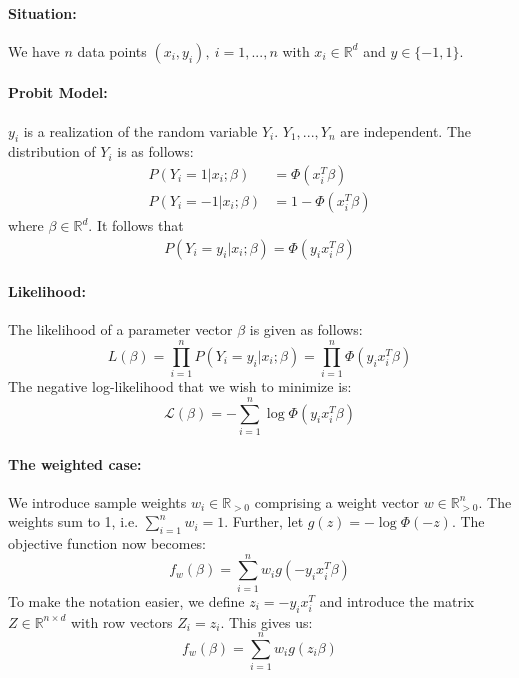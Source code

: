 \paragraph{Situation:}
We have $n$ data points $(x_i, y_i), \ i=1,...,n$ with
$x_i \in \mathbb{R}^d$ and $y \in \{ -1, 1\}$.

\paragraph{Probit Model:}
$y_i$ is a realization of the random variable $Y_i$.
$Y_1, ..., Y_n$ are independent.
The distribution of $Y_i$ is as follows:
\begin{align*}
    P(Y_i = 1 | x_i; \beta)  & = \Phi(x_i^T \beta)     \\
    P(Y_i = -1 | x_i; \beta) & = 1 - \Phi(x_i^T \beta)
\end{align*}
where $\beta \in \mathbb{R}^d$.
It follows that
\begin{align*}
    P(Y_i = y_i | x_i; \beta) = \Phi(y_i x_i^T \beta)
\end{align*}

\paragraph{Likelihood:}
The likelihood of a parameter vector $\beta$ is given as follows:
\begin{equation*}
    L(\beta) = \prod_{i=1}^n P(Y_i = y_i | x_i; \beta) = \prod_{i=1}^n \Phi(y_i x_i^T \beta)
\end{equation*}
The negative log-likelihood that we wish to minimize is:
\begin{equation*}
    \mathcal{L}(\beta) = -\sum_{i=1}^n \log \Phi(y_i x_i^T \beta)
\end{equation*}

\paragraph{The weighted case:}
We introduce sample weights $w_i \in \mathbb{R}_{>0}$
comprising a weight vector $w \in \mathbb{R}_{>0}^n$.
The weights sum to 1, i.e. $\sum_{i=1}^n w_i = 1$.
Further, let $g(z) = -\log \Phi(-z)$.
The objective function now becomes:
\begin{equation*}
    f_w(\beta) = \sum_{i=1}^n w_i g(-y_i x_i^T \beta)
\end{equation*}
To make the notation easier, we define $z_i = -y_i x_i^T$ and introduce
the matrix $Z \in \mathbb{R}^{n \times d}$ with row vectors $Z_i = z_i$.
This gives us:
\begin{equation*}
    f_w(\beta) = \sum_{i=1}^n w_i g(z_i \beta)
\end{equation*}

